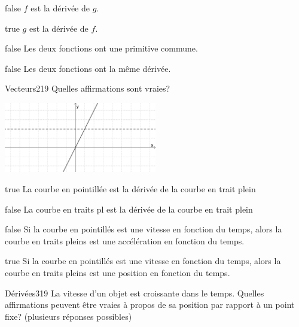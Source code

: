 \documentclass[11pt]{article}
\begin{document}
            \begin{reponses}
                \item[false] $f$ est la dérivée de $g$.
                \item[true] $g$ est la dérivée de $f$.
                \item[false] Les deux fonctions ont une primitive commune.
                \item[false] Les deux fonctions ont la même dérivée.
            \end{reponses}

            \begin{question}{20}{Vecteurs}{2}{19}
                Quelles affirmations sont vraies?
                \begin{center}
                	\includegraphics[width=0.5\textwidth]{Philippe/Figures_Philippe/d_riv_es_2_6.png}
                \end{center}
            \end{question}

            \begin{reponses}
                \item[true] La courbe en pointillée est la dérivée de la courbe en trait plein
                \item[false] La courbe en traits pl est la dérivée de la courbe en trait plein
                \item[false] Si la courbe en pointillés est une vitesse en fonction du temps, alors la courbe en traits pleins est une accélération en fonction du temps.
                \item[true] Si la courbe en pointillés est une vitesse en fonction du temps, alors la courbe en traits pleins est une position en fonction du temps.
            \end{reponses}

            \begin{question}{20}{Dérivées}{3}{19}
                La vitesse d'un objet est croissante dans le temps. Quelles affirmations peuvent être vraies à propos de sa position par rapport à un point fixe? (plusieurs réponses possibles)
            \end{question}
\end{document}
